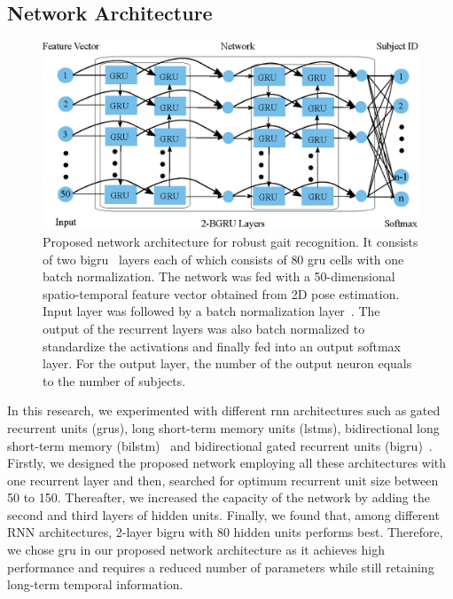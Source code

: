 \subsection{Network Architecture}
\begin{figure}
	\centering 
	\includegraphics[width = \textwidth]{figures/rnn_network.eps}
	
	\caption[Proposed network architecture for robust gait recognition]
	{Proposed network architecture for robust gait recognition. It consists of two \gls{bigru}~\cite{Schuster_97} layers each of which consists of $ 80 $ \gls{gru} cells with one batch normalization. The network was fed with a 50-dimensional spatio-temporal feature vector obtained from 2D pose estimation. Input layer was followed by a batch normalization layer~\cite{Ioffe_15}. The output of the recurrent layers was also batch normalized to standardize the activations and finally fed into an output softmax layer. For the output layer, the number of the output neuron equals to the number of subjects. \label{fig:rnn_network}
    }
\end{figure}


In this research, we experimented with different \gls{rnn} architectures such as gated recurrent units (\gls{gru}s),  long short-term memory units (\gls{lstm}s), bidirectional long short-term memory (\gls{bilstm})~\cite{Graves_05} and bidirectional gated recurrent units (\gls{bigru})~\cite{Schuster_97}. Firstly, we designed the proposed network employing all these architectures with one recurrent layer and then, searched for optimum recurrent unit size between 50 to 150. Thereafter, we increased the capacity of the network by adding the second and third layers of hidden units. Finally, we found that, among different RNN architectures, 2-layer \gls{bigru} with 80 hidden units performs best. Therefore, we chose \gls{gru} in our proposed network architecture as it achieves high performance and requires a reduced number of parameters while still retaining long-term temporal information.

